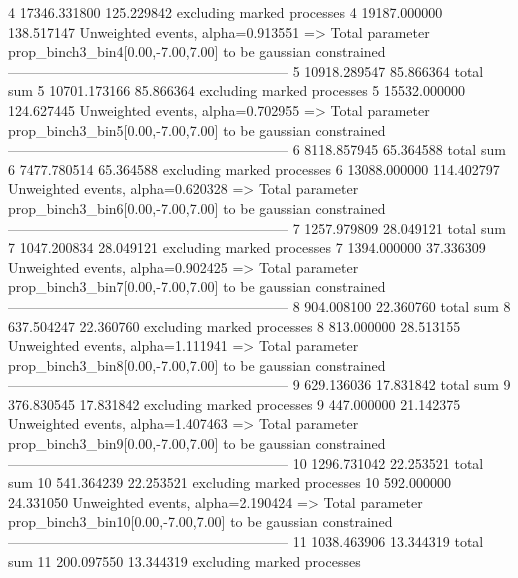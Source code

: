 4          17346.331800    125.229842      excluding marked processes    
4          19187.000000    138.517147      Unweighted events, alpha=0.913551
  => Total parameter prop_binch3_bin4[0.00,-7.00,7.00] to be gaussian constrained
------------------------------------------------------------
5          10918.289547    85.866364       total sum                     
5          10701.173166    85.866364       excluding marked processes    
5          15532.000000    124.627445      Unweighted events, alpha=0.702955
  => Total parameter prop_binch3_bin5[0.00,-7.00,7.00] to be gaussian constrained
------------------------------------------------------------
6          8118.857945     65.364588       total sum                     
6          7477.780514     65.364588       excluding marked processes    
6          13088.000000    114.402797      Unweighted events, alpha=0.620328
  => Total parameter prop_binch3_bin6[0.00,-7.00,7.00] to be gaussian constrained
------------------------------------------------------------
7          1257.979809     28.049121       total sum                     
7          1047.200834     28.049121       excluding marked processes    
7          1394.000000     37.336309       Unweighted events, alpha=0.902425
  => Total parameter prop_binch3_bin7[0.00,-7.00,7.00] to be gaussian constrained
------------------------------------------------------------
8          904.008100      22.360760       total sum                     
8          637.504247      22.360760       excluding marked processes    
8          813.000000      28.513155       Unweighted events, alpha=1.111941
  => Total parameter prop_binch3_bin8[0.00,-7.00,7.00] to be gaussian constrained
------------------------------------------------------------
9          629.136036      17.831842       total sum                     
9          376.830545      17.831842       excluding marked processes    
9          447.000000      21.142375       Unweighted events, alpha=1.407463
  => Total parameter prop_binch3_bin9[0.00,-7.00,7.00] to be gaussian constrained
------------------------------------------------------------
10         1296.731042     22.253521       total sum                     
10         541.364239      22.253521       excluding marked processes    
10         592.000000      24.331050       Unweighted events, alpha=2.190424
  => Total parameter prop_binch3_bin10[0.00,-7.00,7.00] to be gaussian constrained
------------------------------------------------------------
11         1038.463906     13.344319       total sum                     
11         200.097550      13.344319       excluding marked processes    
